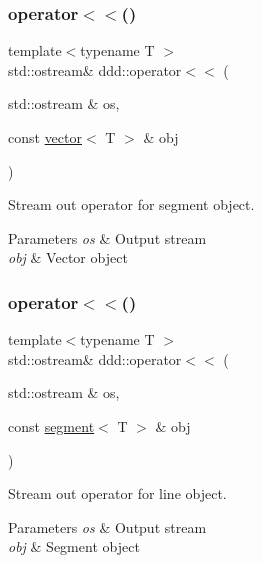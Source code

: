 \subsubsection{\texorpdfstring{operator$<$$<$()}{operator<<()}\hspace{0.1cm}{\footnotesize\ttfamily [2/10]}}
{\footnotesize\ttfamily template$<$typename T $>$ \\
std\+::ostream\& ddd\+::operator$<$$<$ (\begin{DoxyParamCaption}\item[{std\+::ostream \&}]{os,  }\item[{const \hyperlink{classddd_1_1vector}{vector}$<$ T $>$ \&}]{obj }\end{DoxyParamCaption})\hspace{0.3cm}{\ttfamily [inline]}}



Stream out operator for segment object. 


\begin{DoxyParams}{Parameters}
{\em os} & Output stream \\
\hline
{\em obj} & Vector object \\
\hline
\end{DoxyParams}
\mbox{\label{namespaceddd_a59e2fa950fd945aa8b3dd550720ad3f5}} 
\subsubsection{\texorpdfstring{operator$<$$<$()}{operator<<()}\hspace{0.1cm}{\footnotesize\ttfamily [3/10]}}
{\footnotesize\ttfamily template$<$typename T $>$ \\
std\+::ostream\& ddd\+::operator$<$$<$ (\begin{DoxyParamCaption}\item[{std\+::ostream \&}]{os,  }\item[{const \hyperlink{classddd_1_1segment}{segment}$<$ T $>$ \&}]{obj }\end{DoxyParamCaption})\hspace{0.3cm}{\ttfamily [inline]}}



Stream out operator for line object. 


\begin{DoxyParams}{Parameters}
{\em os} & Output stream \\
\hline
{\em obj} & Segment object \\
\hline
\end{DoxyParams}
\mbox{\label{namespaceddd_a2001eec5d960802592e1ca6a5b0dc203}} 
